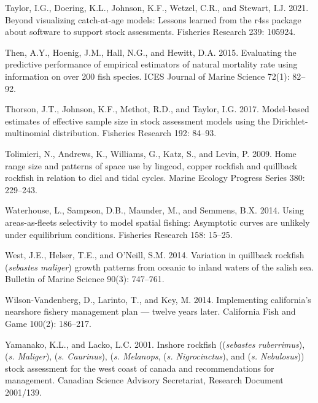 \documentclass[11pt,
  english,
  letterpaper,
]{article}
\begin{document}
\leavevmode\hypertarget{ref-r4ss_2021}{}%
Taylor, I.G., Doering, K.L., Johnson, K.F., Wetzel, C.R., and Stewart, I.J. 2021. Beyond visualizing catch-at-age models: Lessons learned from the r4ss package about software to support stock assessments. Fisheries Research 239: 105924.

\leavevmode\hypertarget{ref-then_evaluating_2015-1}{}%
Then, A.Y., Hoenig, J.M., Hall, N.G., and Hewitt, D.A. 2015. Evaluating the predictive performance of empirical estimators of natural mortality rate using information on over 200 fish species. ICES Journal of Marine Science 72(1): 82--92.

\leavevmode\hypertarget{ref-thorson_model-based_2017}{}%
Thorson, J.T., Johnson, K.F., Methot, R.D., and Taylor, I.G. 2017. Model-based estimates of effective sample size in stock assessment models using the Dirichlet-multinomial distribution. Fisheries Research 192: 84--93.

\leavevmode\hypertarget{ref-tolimieri_home_2009}{}%
Tolimieri, N., Andrews, K., Williams, G., Katz, S., and Levin, P. 2009. Home range size and patterns of space use by lingcod, copper rockfish and quillback rockfish in relation to diel and tidal cycles. Marine Ecology Progress Series 380: 229--243.

\leavevmode\hypertarget{ref-Waterhouseetal_spatialSelex_2014}{}%
Waterhouse, L., Sampson, D.B., Maunder, M., and Semmens, B.X. 2014. Using areas-as-fleets selectivity to model spatial fishing: Asymptotic curves are unlikely under equilibrium conditions. Fisheries Research 158: 15--25.

\leavevmode\hypertarget{ref-Westetal_2014}{}%
West, J.E., Helser, T.E., and O'Neill, S.M. 2014. Variation in quillback rockfish (\emph{sebastes maliger}) growth patterns from oceanic to inland waters of the salish sea. Bulletin of Marine Science 90(3): 747--761.

\leavevmode\hypertarget{ref-Wilson-Vandenbergetal_2014}{}%
Wilson-Vandenberg, D., Larinto, T., and Key, M. 2014. Implementing california's nearshore fishery management plan --- twelve years later. California Fish and Game 100(2): 186--217.

\leavevmode\hypertarget{ref-YamanakaandLacko_rockfish_2001}{}%
Yamanako, K.L., and Lacko, L.C. 2001. Inshore rockfish ((\emph{sebastes ruberrimus}), (\emph{s. Maliger}), (\emph{s. Caurinus}), (\emph{s. Melanops}, (\emph{s. Nigrocinctus}), and (\emph{s. Nebulosus})) stock assessment for the west coast of canada and recommendations for management. Canadian Science Advisory Secretariat, Research Document 2001/139.
\end{document}
